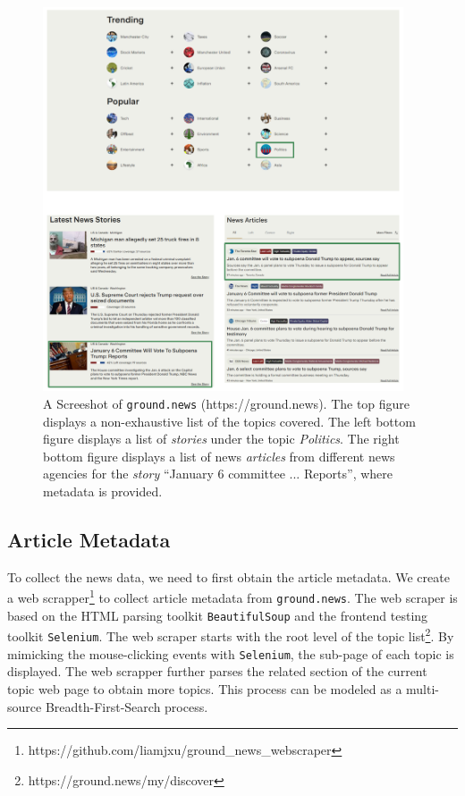 \begin{figure}[ht!]
    \centering
    \includegraphics[width=0.95\textwidth]{img/ground_news.png}
    \caption{A Screeshot of \texttt{ground.news} (https://ground.news). The top figure displays a non-exhaustive list of the topics covered. The left bottom figure displays a list of \textit{stories} under the topic \textit{Politics}. The right bottom figure displays a list of news \textit{articles} from different news agencies for the \textit{story} ``January 6 committee ... Reports'', where metadata is provided.}
    \label{fig:ground-news}
\end{figure}

\subsection{Article Metadata}
\label{article-metadata}
To collect the news data, we need to first obtain the article metadata. We create a web scrapper\footnote{https://github.com/liamjxu/ground\_news\_webscraper} to collect article metadata from \texttt{ground.news}. The web scraper is based on the HTML parsing toolkit \texttt{BeautifulSoup} and the frontend testing toolkit \texttt{Selenium}. The web scraper starts with the root level of the topic list\footnote{https://ground.news/my/discover}. By mimicking the mouse-clicking events with \texttt{Selenium}, the sub-page of each topic is displayed. The web scrapper further parses the related section of the current topic web page to obtain more topics. This process can be modeled as a multi-source Breadth-First-Search process.

